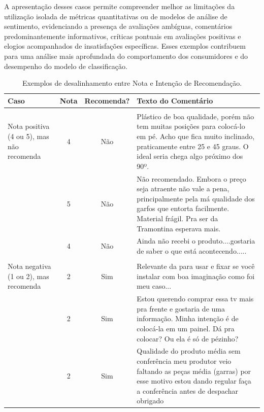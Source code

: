 \documentclass{IEEEtran}
\begin{document}
A apresentação desses casos permite compreender melhor as limitações da utilização isolada de métricas quantitativas ou de modelos de análise de sentimento, evidenciando a presença de avaliações ambíguas, comentários predominantemente informativos, críticas pontuais em avaliações positivas e elogios acompanhados de insatisfações específicas. 
Esses exemplos contribuem para uma análise mais aprofundada do comportamento dos consumidores e do desempenho do modelo de classificação.

\begin{table}[htpb]
    \centering
    \caption{Exemplos de desalinhamento entre Nota e Intenção de Recomendação.}
    \label{tab:desalinhamento_nota_recomendacao}
    \renewcommand{\arraystretch}{1.4} %
    \begin{tabular}{>{\raggedright\arraybackslash}p{3cm} c c p{8cm}}
        \toprule
        \textbf{Caso} & \textbf{Nota} & \textbf{Recomenda?} & \textbf{Texto do Comentário} \\
        \midrule
        \multirow{6}{=}{\textbf{1a} \\ Nota positiva (4 ou 5), mas não recomenda} 
        & 4 & Não & Plástico de boa qualidade, porém não tem muitas posições para colocá-lo em pé. Acho que fica muito inclinado, praticamente entre 25 e 45 graus. O ideal seria chega algo próximo dos 90º. \\
        \cmidrule{2-4}
        & 5 & Não & Não recomendado. Embora o preço seja atraente não vale a pena, principalmente pela má qualidade dos garfos que entorta facilmente. Material frágil. Pra ser da Tramontina esperava mais. \\
        \cmidrule{2-4}
        & 4 & Não & Ainda não recebi o produto....gostaria de saber o que está acontecendo..... \\
        \midrule
        \multirow{6}{=}{\textbf{1b} \\ Nota negativa (1 ou 2), mas recomenda} 
        & 2 & Sim & Relevante da para usar e fixar se você instalar com boa imaginação como foi meu caso... \\
        \cmidrule{2-4}
        & 2 & Sim & Estou querendo comprar essa tv mais pra frente e gostaria de uma informação. Minha intenção é de colocá-la em um painel. Dá pra colocar? Ou ela é só de pézinho? \\
        \cmidrule{2-4}
        & 2 & Sim & Qualidade do produto média sem conferência meu produtor veio faltando as peças média (garras) por esse motivo estou dando regular faça a conferência antes de despachar obrigado \\
        \bottomrule
    \end{tabular}
\end{table}
\end{document}
